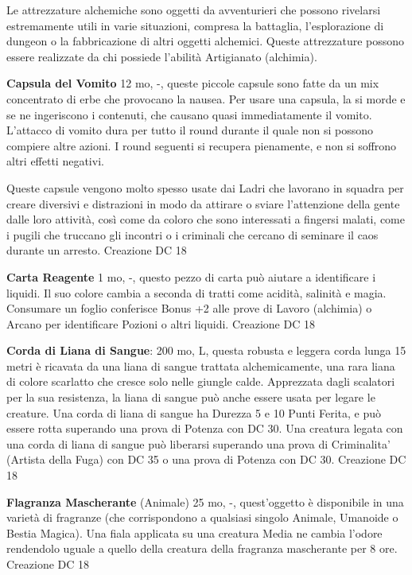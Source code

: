 \documentclass[a4paper,11pt,twoside,openany]{book}
\begin{document}
{\label{attrezzature-alchemiche}

Le attrezzature alchemiche sono oggetti da avventurieri che possono rivelarsi estremamente utili in varie situazioni, compresa la battaglia, l'esplorazione di dungeon o la fabbricazione di altri oggetti alchemici. Queste attrezzature possono essere realizzate da chi possiede l'abilità Artigianato (alchimia).

\textbf{Capsula del Vomito} 12 mo, -, queste piccole capsule sono fatte da un mix concentrato di erbe che provocano la nausea. Per usare una capsula, la si morde e se ne ingeriscono i contenuti, che causano quasi immediatamente il vomito. L'attacco di vomito dura per tutto il round durante il quale non si possono compiere altre azioni. I round seguenti si recupera pienamente, e non si soffrono altri effetti negativi.

Queste capsule vengono molto spesso usate dai Ladri che lavorano in squadra per creare diversivi e distrazioni in modo da attirare o sviare l'attenzione della gente dalle loro attività, così come da coloro che sono interessati a fingersi malati, come i pugili che truccano gli incontri o i criminali che cercano di seminare il caos durante un arresto. Creazione DC 18

\textbf{Carta Reagente} 1 mo, -, questo pezzo di carta può aiutare a identificare i liquidi. Il suo colore cambia a seconda di tratti come acidità, salinità e magia. Consumare un foglio conferisce Bonus +2 alle prove di Lavoro (alchimia) o Arcano per identificare Pozioni o altri liquidi. Creazione DC 18

\textbf{Corda di Liana di Sangue}: 200 mo, L, questa robusta e leggera corda lunga 15 metri è ricavata da una liana di sangue trattata alchemicamente, una rara liana di colore scarlatto che cresce solo nelle giungle calde.
Apprezzata dagli scalatori per la sua resistenza, la liana di sangue può anche essere usata per legare le creature. Una corda di liana di sangue ha Durezza 5 e 10 Punti Ferita, e può essere rotta superando una prova di Potenza con DC 30.
Una creatura legata con una corda di liana di sangue può liberarsi superando una prova di Criminalita’ (Artista della Fuga) con DC 35 o una prova di Potenza con DC 30. Creazione DC 18

\textbf{Flagranza Mascherante} (Animale) 25 mo, -, quest'oggetto è disponibile in una varietà di fragranze (che corrispondono a qualsiasi singolo Animale, Umanoide o Bestia Magica). Una fiala applicata su una creatura Media ne cambia l'odore rendendolo uguale a quello della creatura della fragranza mascherante per 8 ore. Creazione DC 18

}
\end{document}
